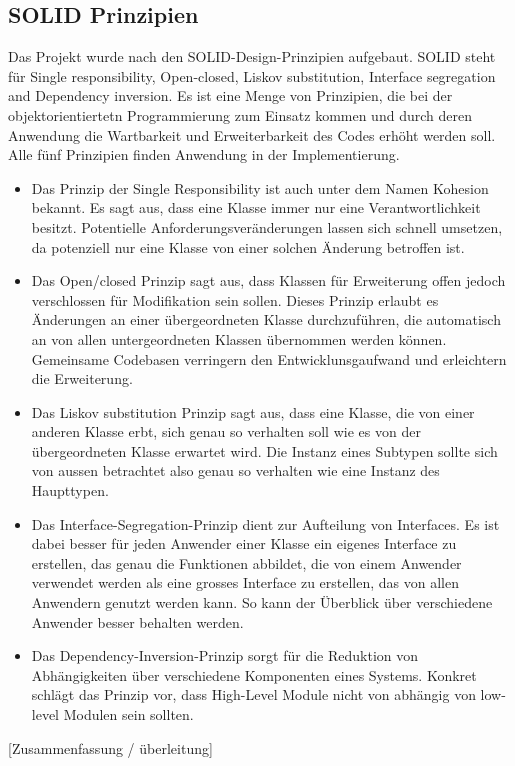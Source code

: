 



\subsection{SOLID Prinzipien}

Das Projekt wurde nach den SOLID-Design-Prinzipien \cite{unclebob1995} aufgebaut. SOLID steht für Single responsibility, Open-closed, Liskov substitution, Interface segregation and Dependency inversion. Es ist eine Menge von Prinzipien, die bei der objektorientiertetn Programmierung zum Einsatz kommen und durch deren Anwendung die Wartbarkeit und Erweiterbarkeit des Codes erhöht werden soll. Alle fünf Prinzipien finden Anwendung in der Implementierung.

\begin{itemize}
\item Das Prinzip der Single Responsibility  ist auch unter dem Namen Kohesion bekannt. Es sagt aus, dass eine Klasse immer nur eine Verantwortlichkeit besitzt.  Potentielle Anforderungsveränderungen lassen sich schnell umsetzen, da potenziell nur eine Klasse von einer solchen Änderung betroffen ist.

\item Das Open/closed Prinzip sagt aus, dass Klassen für Erweiterung offen jedoch verschlossen für Modifikation sein sollen. Dieses Prinzip erlaubt es Änderungen an einer übergeordneten Klasse durchzuführen, die automatisch an von allen untergeordneten Klassen übernommen werden können. Gemeinsame Codebasen verringern den Entwicklunsgaufwand und erleichtern die Erweiterung.

\item Das Liskov substitution Prinzip sagt aus, dass eine Klasse, die von einer anderen Klasse erbt, sich genau so verhalten soll wie es von der übergeordneten Klasse erwartet wird. Die Instanz eines Subtypen sollte sich von aussen betrachtet also genau so verhalten wie eine Instanz des Haupttypen.

\item Das Interface-Segregation-Prinzip dient zur Aufteilung von Interfaces. Es ist dabei besser für jeden Anwender einer Klasse ein eigenes Interface zu erstellen, das genau die Funktionen abbildet, die von einem Anwender verwendet werden als eine grosses Interface zu erstellen, das von allen Anwendern genutzt werden kann. So kann der Überblick über verschiedene Anwender besser behalten werden.

\item Das Dependency-Inversion-Prinzip sorgt für die Reduktion von Abhängigkeiten über verschiedene Komponenten eines Systems. Konkret schlägt das Prinzip vor, dass High-Level Module nicht von abhängig von low-level Modulen sein sollten.

\end{itemize}

[Zusammenfassung / überleitung]
